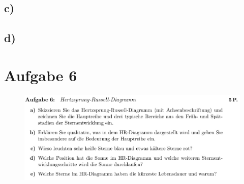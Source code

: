 \subsection{c)}

\subsection{d)}


\section{Aufgabe 6}

\begin{figure}[H]
    \centering
    \includegraphics[width=\textwidth]{images/Aufgabe6.jpg}
    \label{fig:3}
\end{figure}

